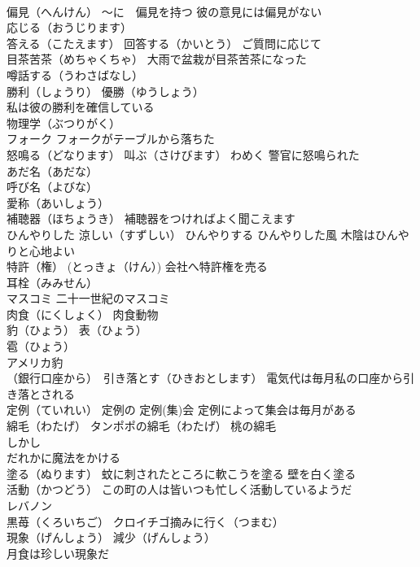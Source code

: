 \documentclass[8pt]{extreport}
\begin{document}
\begin{CJK}{UTF8}{min}
\\	偏見（へんけん） ～に　偏見を持つ 彼の意見には偏見がない
\\	応じる（おうじります） 
\\	答える（こたえます） 回答する（かいとう） ご質問に応じて
\\	目茶苦茶（めちゃくちゃ） 大雨で盆栽が目茶苦茶になった
\\	噂話する（うわさばなし）
\\	勝利（しょうり） 優勝（ゆうしょう） 
\\	私は彼の勝利を確信している
\\	物理学（ぶつりがく）
\\	フォーク フォークがテーブルから落ちた
\\	怒鳴る（どなります） 叫ぶ（さけびます） わめく 警官に怒鳴られた
\\	あだ名（あだな）
\\	呼び名（よびな）
\\	愛称（あいしょう） 
\\	補聴器（ほちょうき） 補聴器をつければよく聞こえます
\\	ひんやりした 涼しい（すずしい） ひんやりする ひんやりした風 木陰はひんやりと心地よい
\\	特許（権） (とっきょ（けん）) 会社へ特許権を売る
\\	耳栓（みみせん）
\\	マスコミ 二十一世紀のマスコミ
\\	肉食（にくしょく） 肉食動物
\\	豹（ひょう） 表（ひょう） 
\\	雹（ひょう） 
\\	アメリカ豹
\\	（銀行口座から）　引き落とす（ひきおとします） 電気代は毎月私の口座から引き落とされる
\\	定例（ていれい） 定例の 定例(集)会 定例によって集会は毎月がある
\\	綿毛（わたげ） タンポポの綿毛（わたげ） 桃の綿毛
\\	しかし
\\	だれかに魔法をかける
\\	塗る（ぬります） 蚊に刺されたところに軟こうを塗る 壁を白く塗る
\\	活動（かつどう） この町の人は皆いつも忙しく活動しているようだ
\\	レバノン
\\	黒苺（くろいちご） クロイチゴ摘みに行く（つまむ）
\\	現象（げんしょう） 減少（げんしょう）
\\	月食は珍しい現象だ

\end{CJK}
\end{document}
